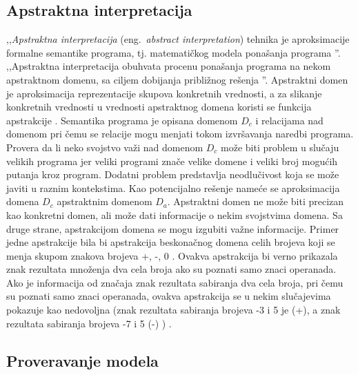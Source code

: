 \documentclass[12pt,oneside]{memoir}
\begin{document}
\subsection{Apstraktna interpretacija}
,,\textit{Apstraktna interpretacija} (eng.~\textit{abstract interpretation}) tehnika je aproksimacije formalne semantike programa, tj. matematičkog modela ponašanja programa \cite{mvj}''. ,,Apstraktna interpretacija obuhvata procenu ponašanja programa na nekom apstraktnom domenu, sa ciljem dobijanja približnog rešenja \cite{AutoTechnFormSofVer}''. Apstraktni domen je aproksimacija reprezentacije skupova konkretnih vrednosti, a za slikanje konkretnih vrednosti u vrednosti apstraktnog domena koristi se funkcija apstrakcije \cite{AutoTechnFormSofVer}. Semantika programa je opisana domenom $D_c$ i relacijama nad domenom pri čemu se relacije mogu menjati tokom izvršavanja naredbi programa. Provera da li neko svojstvo važi nad domenom $D_c$ može biti problem u slučaju velikih programa jer veliki programi znače velike domene i veliki broj mogućih putanja kroz program. Dodatni problem predstavlja neodlučivost koja se može javiti u raznim kontekstima. Kao potencijalno rešenje nameće se aproksimacija domena $D_c$ apstraktnim domenom $D_a$. Apstraktni domen ne može biti precizan kao konkretni domen, ali može dati informacije o nekim svojstvima domena. Sa druge strane, apstrakcijom domena se mogu izgubiti važne informacije. Primer jedne apstrakcije bila bi apstrakcija beskonačnog domena celih brojeva koji se menja skupom znakova brojeva {+, -, 0 }. Ovakva apstrakcija bi verno prikazala znak rezultata množenja dva cela broja ako su poznati samo znaci operanada. Ako je informacija od značaja znak rezultata sabiranja dva cela broja, pri čemu su poznati samo znaci operanada, ovakva apstrakcija se u nekim slučajevima pokazuje kao nedovoljna (znak rezultata sabiranja brojeva -3 i 5 je (+), a znak rezultata sabiranja brojeva -7 i 5 (-) ) \cite{mvj}. 


\subsection{Proveravanje modela}
\end{document}

